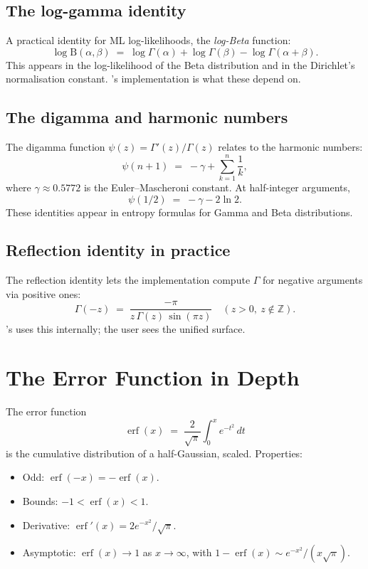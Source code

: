 \subsection{The log-gamma identity}
\label{ssec:special_functions:lgamma_identity}

A practical identity for ML log-likelihoods, the
\emph{log-Beta} function:
\[
\log \mathrm{B}(\alpha, \beta) \;=\; \log\Gamma(\alpha) +
\log\Gamma(\beta) - \log\Gamma(\alpha + \beta).
\]
This appears in the log-likelihood of the Beta distribution and
in the Dirichlet's normalisation constant. \Lucid's 
implementation is what these depend on.

\subsection{The digamma and harmonic numbers}
\label{ssec:special_functions:digamma_harmonic}

The digamma function $\psi(z) = \Gamma'(z) / \Gamma(z)$ relates
to the harmonic numbers:
\[
\psi(n+1) \;=\; -\gamma + \sum_{k=1}^n \frac{1}{k},
\]
where $\gamma \approx 0.5772$ is the Euler--Mascheroni constant.
At half-integer arguments,
\[
\psi(1/2) \;=\; -\gamma - 2\ln 2.
\]
These identities appear in entropy formulas for Gamma and Beta
distributions.

\subsection{Reflection identity in practice}
\label{ssec:special_functions:reflection}

The reflection identity lets the implementation compute $\Gamma$
for negative arguments via positive ones:
\[
\Gamma(-z) \;=\; \frac{-\pi}{z\,\Gamma(z)\,\sin(\pi z)}
\quad (z > 0,\ z \notin \mathbb{Z}).
\]
\Lucid's  uses this internally; the user sees the
unified surface.

\section{The Error Function in Depth}
\label{sec:special_functions:erf_depth}

The error function
\[
\operatorname{erf}(x) \;=\; \frac{2}{\sqrt{\pi}} \int_0^x e^{-t^2}\, dt
\]
is the cumulative distribution of a half-Gaussian, scaled.
Properties:

\begin{itemize}
  \item Odd: $\operatorname{erf}(-x) = -\operatorname{erf}(x)$.
  \item Bounds: $-1 < \operatorname{erf}(x) < 1$.
  \item Derivative: $\operatorname{erf}'(x) = 2 e^{-x^2} / \sqrt{\pi}$.
  \item Asymptotic: $\operatorname{erf}(x) \to 1$ as $x \to
    \infty$, with $1 - \operatorname{erf}(x) \sim e^{-x^2} /
    (x\sqrt{\pi})$.
\end{itemize}

